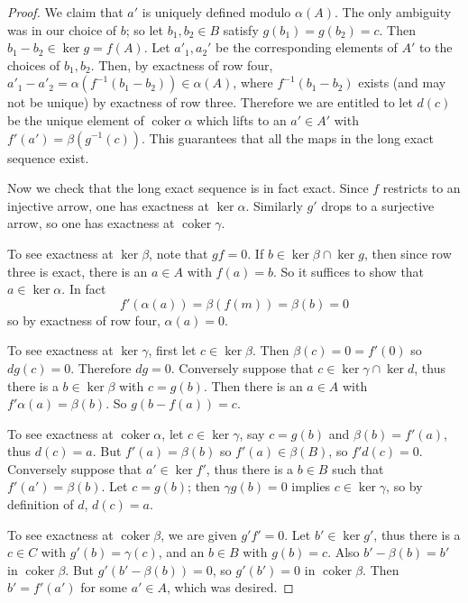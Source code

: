 \documentclass[10pt]{article}
\newcommand{\coker}{\operatorname{coker}}
\theoremstyle{definition}
\begin{document}
\begin{proof}
We claim that $a'$ is uniquely defined modulo $\alpha(A)$.
The only ambiguity was in our choice of $b$; so let $b_1, b_2 \in B$ satisfy $g(b_1) = g(b_2) = c$.
Then $b_1 - b_2 \in \ker g = f(A)$.
Let $a'_1, a_2'$ be the corresponding elements of $A'$ to the choices of $b_1, b_2$.
Then, by exactness of row four, $a'_1 - a'_2 = \alpha(f^{-1}(b_1 - b_2)) \in \alpha(A)$, where $f^{-1}(b_1 - b_2)$ exists (and may not be unique) by exactness of row three.
Therefore we are entitled to let $d(c)$ be the unique element of $\coker \alpha$ which lifts to an $a' \in A'$ with $f'(a') = \beta(g^{-1}(c))$.
This guarantees that all the maps in the long exact sequence exist.

Now we check that the long exact sequence is in fact exact.
Since $f$ restricts to an injective arrow, one has exactness at $\ker \alpha$.
Similarly $g'$ drops to a surjective arrow, so one has exactness at $\coker \gamma$.

To see exactness at $\ker \beta$, note that $gf = 0$.
If $b \in \ker \beta \cap \ker g$, then since row three is exact, there is an $a \in A$ with $f(a) = b$.
So it suffices to show that $a \in \ker \alpha$.
In fact
$$f'(\alpha(a)) = \beta(f(m)) = \beta(b) = 0$$
so by exactness of row four, $\alpha(a) = 0$.

To see exactness at $\ker \gamma$, first let $c \in \ker \beta$.
Then $\beta(c) = 0 = f'(0)$ so $dg(c) = 0$. Therefore $dg = 0$.
Conversely suppose that $c \in \ker \gamma \cap \ker d$, thus there is a $b \in \ker \beta$ with $c = g(b)$.
Then there is an $a \in A$ with $f'\alpha(a) = \beta(b)$. So $g(b-f(a)) = c$.

To see exactness at $\coker \alpha$, let $c \in \ker \gamma$, say $c = g(b)$ and $\beta(b) = f'(a)$, thus $d(c) = a$.
But $f'(a) = \beta(b)$ so $f'(a) \in \beta(B)$, so $f' d(c) = 0$.
Conversely suppose that $a' \in \ker f'$, thus there is a $b \in B$ such that $f'(a') = \beta(b)$.
Let $c = g(b)$; then $\gamma g(b) = 0$ implies $c \in \ker \gamma$, so by definition of $d$, $d(c) = a$.

To see exactness at $\coker \beta$, we are given $g'f' = 0$.
Let $b' \in \ker g'$, thus there is a $c \in C$ with $g'(b) = \gamma(c)$, and an $b \in B$ with $g(b) = c$.
Also $b' - \beta(b) = b'$ in $\coker \beta$.
But $g'(b' - \beta(b)) = 0$, so $g'(b') = 0$ in $\coker \beta$.
Then $b' = f'(a')$ for some $a' \in A$, which was desired.
\end{proof}
\end{document}
